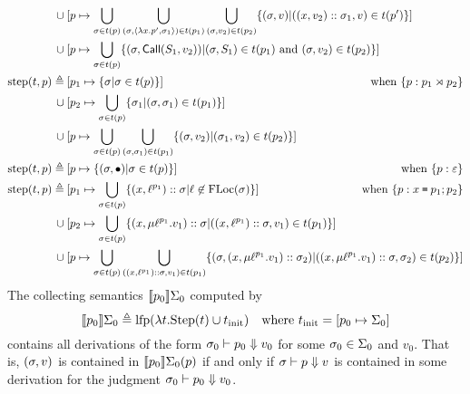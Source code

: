 \begin{align*}
  \cup                       & \: [p\mapsto\bigcup_{\ctx\in \ptree(p)}\bigcup_{(\ctx,\langle\lambda x.p',\ctx_1\rangle)\in \ptree(p_1)}\bigcup_{(\ctx,v_2)\in \ptree(p_2)}\{(\ctx,v)|((x,v_2)\cons\ctx_1,v)\in \ptree(p')\}]                           \\
  \cup                       & \: [p\mapsto\bigcup_{\ctx\in \ptree(p)}\{(\ctx,\CallE(\event_1,v_2))|(\ctx,\event_1)\in \ptree(p_1)\textnormal{ and }(\ctx,v_2)\in \ptree(p_2)\}]                                                                       \\
  \step(\ptree,p) \triangleq & \specialcell{\:[p_1\mapsto\{\ctx|\ctx\in \ptree(p)\}]\hfill\textnormal{when }\plabel{p}{{p_1}\synlink{p_2}}}                                                                                                            \\
  \cup                       & \: [p_2\mapsto\bigcup_{\ctx\in \ptree(p)}\{\ctx_1|(\ctx,\ctx_1)\in \ptree(p_1)\}]                                                                                                                                       \\
  \cup                       & \: [p\mapsto\bigcup_{\ctx\in \ptree(p)}\bigcup_{(\ctx,\ctx_1)\in \ptree(p_1)}\{(\ctx,v_2)|(\ctx_1,v_2)\in \ptree(p_2)\}]                                                                                                \\
  \step(\ptree,p) \triangleq & \specialcell{\:[p\mapsto\{(\ctx,\bullet)|\ctx\in \ptree(p)\}]\hfill\textnormal{when }\plabel{p}{\varepsilon}}                                                                                                           \\
  \step(\ptree,p) \triangleq & \specialcell{\:[p_1\mapsto\bigcup_{\ctx\in\ptree(p)}\{(x,\llabel{p_1}{\ell})\cons\ctx|\ell\not\in\FLoc(\ctx)\}]\hfill\textnormal{when }\plabel{p}{x\:\texttt{=}\:p_1;p_2}}                                              \\
  \cup                       & \: [p_2\mapsto\bigcup_{\ctx\in\ptree(p)}\{(x,\mu\llabel{p_1}{\ell}.v_1)\cons\ctx|((x,\llabel{p_1}{\ell})\cons\ctx,v_1)\in \ptree(p_1)\}]                                                                                \\
  \cup                       & \: [p\mapsto\bigcup_{\ctx\in \ptree(p)}\bigcup_{((x,\llabel{p_1}{\ell})\cons\ctx,v_1)\in\ptree(p_1)}\{(\ctx,(x,\mu\llabel{p_1}{\ell}.v_1)\cons\ctx_2)|((x,\mu\llabel{p_1}{\ell}.v_1)\cons\ctx,\ctx_2)\in \ptree(p_2)\}]
\end{align*}
The collecting semantics $\llbracket{p_0}\rrbracket\Sigma_0$ computed by
\[\llbracket{p_0}\rrbracket\Sigma_0\triangleq\textnormal{lfp}(\lambda t.\textnormal{Step}(t)\cup t_{\textnormal{init}})\quad\textnormal{where }t_{\textnormal{init}}=[p_0\mapsto\Sigma_0]\]
contains all derivations of the form ${\sigma_0}\vdash{p_0}\Downarrow{v_0}$ for some $\sigma_0\in\Sigma_0$ and $v_0$.
That is, $(\sigma,v)$ is contained in $\llbracket{p_0}\rrbracket\Sigma_0(p)$ if and only if ${\sigma}\vdash{p}\Downarrow{v}$ is contained in some derivation for the judgment ${\sigma_0}\vdash{p_0}\Downarrow{v_0}$.

